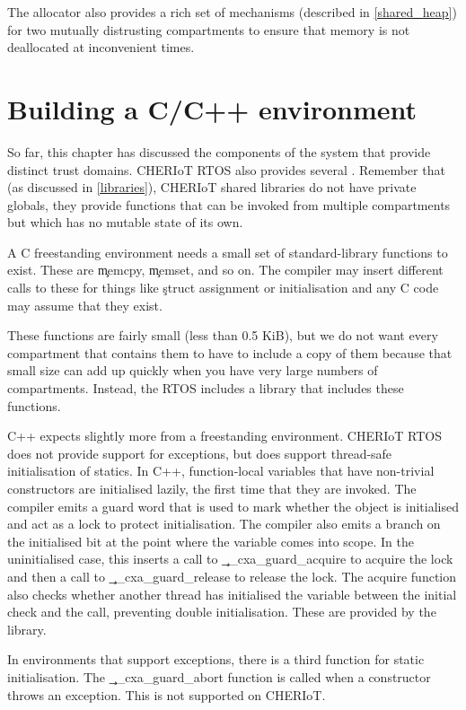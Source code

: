 The allocator also provides a rich set of mechanisms (described in \ref{shared_heap}) for two mutually distrusting compartments to ensure that memory is not deallocated at inconvenient times.

\section{Building a C/C++ environment}

So far, this chapter has discussed the components of the system that provide distinct trust domains.
CHERIoT RTOS also provides several .
Remember that (as discussed in \ref{libraries}), CHERIoT shared libraries do not have private globals, they provide functions that can be invoked from multiple compartments but which has no mutable state of its own.

A C freestanding environment needs a small set of standard-library functions to exist.
These are \c{memcpy}, \c{memset}, and so on.
The compiler may insert different calls to these for things like \c{struct} assignment or initialisation and any C code may assume that they exist.

These functions are fairly small (less than 0.5 KiB), but we do not want every compartment that contains them to have to include a copy of them because that small size can add up quickly when you have very large numbers of compartments.
Instead, the RTOS includes a  library that includes these functions.

C++ expects slightly more from a freestanding environment.
CHERIoT RTOS does not provide support for exceptions, but does support thread-safe initialisation of statics.
In C++, function-local  variables that have non-trivial constructors are initialised lazily, the first time that they are invoked.
The compiler emits a guard word that is used to mark whether the object is initialised and act as a lock to protect initialisation.
The compiler also emits a branch on the initialised bit at the point where the variable comes into scope.
In the uninitialised case, this inserts a call to \c{__cxa_guard_acquire} to acquire the lock and then a call to \c{__cxa_guard_release} to release the lock.
The acquire function also checks whether another thread has initialised the variable between the initial check and the call, preventing double initialisation.
These are provided by the  library.

\begin{note}
In environments that support exceptions, there is a third function for static initialisation.
The \c{__cxa_guard_abort} function is called when a constructor throws an exception.
This is not supported on CHERIoT.
\end{note}

